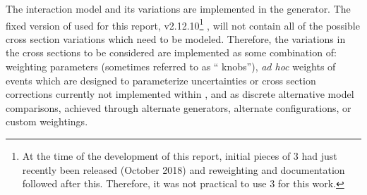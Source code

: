 

The interaction model and its variations are implemented in the   generator.  The fixed version of  used for this report, v2.12.10\footnote{At the time of the development of this report, initial pieces of  3 had just recently been released (October 2018) and reweighting and documentation followed after this.  Therefore, it was not practical to use  3 for this work.}
, will not contain all of the possible cross section variations which need to be modeled.  Therefore, the variations in the cross sections to be considered are implemented as some combination of:  weighting parameters (sometimes referred to as `` knobs''), {\it ad hoc} weights of events which are designed to parameterize uncertainties or cross section corrections currently not implemented within , and as discrete alternative model comparisons, achieved through alternate generators, alternate  configurations, or custom weightings. 


